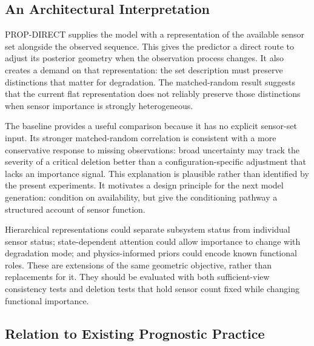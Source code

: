 \subsection{An Architectural Interpretation}

PROP-DIRECT supplies the model with a representation of the available sensor set alongside the observed sequence. This gives the predictor a direct route to adjust its posterior geometry when the observation process changes. It also creates a demand on that representation: the set description must preserve distinctions that matter for degradation. The matched-random result suggests that the current flat representation does not reliably preserve those distinctions when sensor importance is strongly heterogeneous.

The baseline provides a useful comparison because it has no explicit sensor-set input. Its stronger matched-random correlation is consistent with a more conservative response to missing observations: broad uncertainty may track the severity of a critical deletion better than a configuration-specific adjustment that lacks an importance signal. This explanation is plausible rather than identified by the present experiments. It motivates a design principle for the next model generation: condition on availability, but give the conditioning pathway a structured account of sensor function.

Hierarchical representations could separate subsystem status from individual sensor status; state-dependent attention could allow importance to change with degradation mode; and physics-informed priors could encode known functional roles. These are extensions of the same geometric objective, rather than replacements for it. They should be evaluated with both sufficient-view consistency tests and deletion tests that hold sensor count fixed while changing functional importance.

\subsection{Relation to Existing Prognostic Practice}

